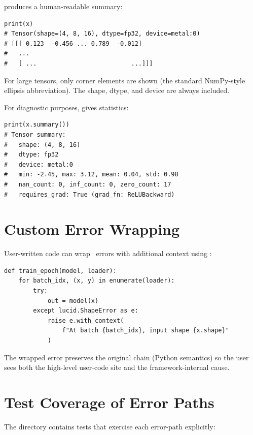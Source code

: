  produces a human-readable summary:

\begin{lstlisting}[style=lucid,language=LucidPython]
print(x)
# Tensor(shape=(4, 8, 16), dtype=fp32, device=metal:0)
# [[[ 0.123  -0.456 ... 0.789  -0.012]
#   ...
#   [ ...                          ...]]]
\end{lstlisting}

For large tensors, only corner elements are shown (the standard
NumPy-style ellipsis abbreviation). The shape, dtype, and device
are always included.

For diagnostic purposes,  gives
statistics:

\begin{lstlisting}[style=lucid,language=LucidPython]
print(x.summary())
# Tensor summary:
#   shape: (4, 8, 16)
#   dtype: fp32
#   device: metal:0
#   min: -2.45, max: 3.12, mean: 0.04, std: 0.98
#   nan_count: 0, inf_count: 0, zero_count: 17
#   requires_grad: True (grad_fn: ReLUBackward)
\end{lstlisting}

\section{Custom Error Wrapping}
\label{sec:error_handling:custom_wrapping}

User-written code can wrap \Lucid\ errors with additional
context using :

\begin{lstlisting}[style=lucid,language=LucidPython]
def train_epoch(model, loader):
    for batch_idx, (x, y) in enumerate(loader):
        try:
            out = model(x)
        except lucid.ShapeError as e:
            raise e.with_context(
                f"At batch {batch_idx}, input shape {x.shape}"
            )
\end{lstlisting}

The wrapped error preserves the original chain (Python
 semantics) so the user sees both the
high-level user-code site and the framework-internal cause.

\section{Test Coverage of Error Paths}
\label{sec:error_handling:error_test_coverage}

The  directory contains tests that
exercise each error-path explicitly:

